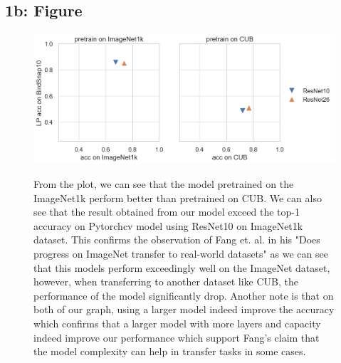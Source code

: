 \documentclass[10pt]{article}
\begin{document}
\newpage

\subsection{1b: Figure}
\renewcommand{\figurename}{Fig.}
\renewcommand{\thefigure}{1b}
 \begin{figure}[!h]
     \centering
     \includegraphics[height=.4\textwidth]{./Figure 1B.png}
     \label{fig:1b}
\caption{
  From the plot, we can see that the model pretrained on the ImageNet1k perform
  better than pretrained on CUB. We can also see that the result obtained from
  our model exceed the top-1 accuracy on Pytorchcv model using ResNet10 on
  ImageNet1k dataset. This confirms the observation of Fang et. al. in his "Does
  progress on ImageNet transfer to real-world datasets" as we can see that this
  models perform exceedingly well on the ImageNet dataset, however, when
  transferring to another dataset like CUB, the performance of the model
  significantly drop. Another note is that on both of our graph, using a larger
  model indeed improve the accuracy which confirms that a larger model with more
  layers and capacity indeed improve our performance which support Fang's claim
  that the model complexity can help in transfer tasks in some cases.
}%
 \end{figure}

\newpage 
\end{document}
